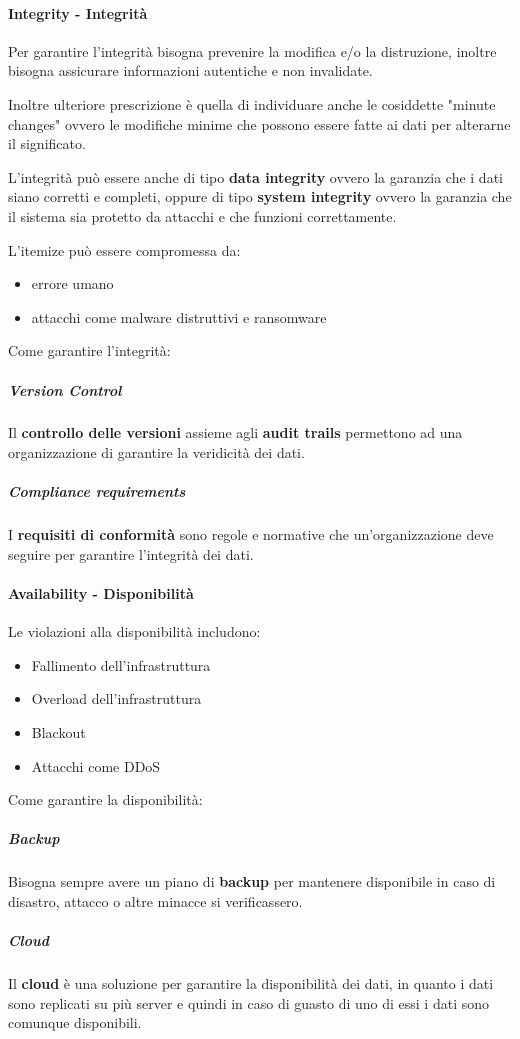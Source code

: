         \paragraph{Integrity - Integrità}
            Per garantire l'integrità bisogna prevenire la modifica e/o la distruzione, inoltre bisogna assicurare informazioni autentiche e non invalidate.

            Inoltre ulteriore prescrizione è quella di individuare anche le cosiddette "minute changes" ovvero le modifiche minime che possono essere fatte ai dati per alterarne il significato. 
            
            L'integrità può essere anche di tipo \textbf{data integrity} ovvero la garanzia che i dati siano corretti e completi, oppure di tipo \textbf{system integrity} ovvero la garanzia che il sistema sia protetto da attacchi e che funzioni correttamente.

            L'itemize può essere compromessa da:
            \begin{itemize}
                \item errore umano
                \item attacchi come malware distruttivi e ransomware
            \end{itemize}
            Come garantire l'integrità:
            \subparagraph{Version Control} Il \textbf{controllo delle versioni} assieme agli \textbf{audit trails} permettono ad una organizzazione di garantire la veridicità dei dati.
            \subparagraph{Compliance requirements} I \textbf{requisiti di conformità} sono regole e normative che un'organizzazione deve seguire per garantire l'integrità dei dati.
        \paragraph{Availability - Disponibilità}
            Le violazioni alla disponibilità includono:
            \begin{itemize}
                \item Fallimento dell'infrastruttura 
                \item Overload dell'infrastruttura
                \item Blackout
                \item Attacchi come DDoS
            \end{itemize}
            Come garantire la disponibilità:
            \subparagraph{Backup} Bisogna sempre avere un piano di \textbf{backup} per mantenere disponibile in caso di disastro, attacco o altre minacce si verificassero.
            \subparagraph{Cloud} Il \textbf{cloud} è una soluzione per garantire la disponibilità dei dati, in quanto i dati sono replicati su più server e quindi in caso di guasto di uno di essi i dati sono comunque disponibili.
        
